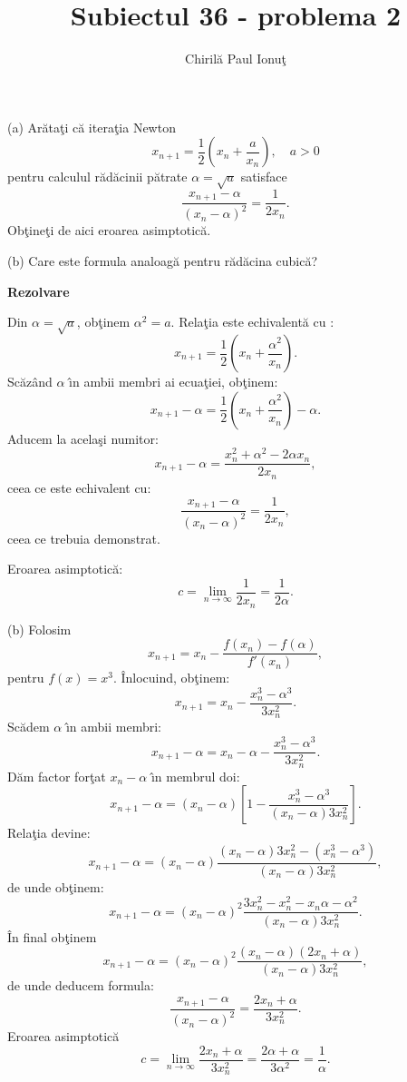 \documentclass[11pt]{article}
\theoremstyle{plain}
\theoremstyle{definition}
\theoremstyle{definition}
\theoremstyle{definition}
\theoremstyle{definition}
\theoremstyle{plain}
\begin{document}
\title{Subiectul 36 - problema 2}
\author{Chiril\u{a} Paul Ionu\c{t}}
\date{}
\maketitle
(a) Ar\u{a}ta\c{t}i c\u{a} itera\c{t}ia Newton
$$x_{n+1} = \frac{1}{2}\left(x_n + \frac{a}{x_n}\right), \quad a>0$$
pentru calculul r\u ad\u acinii p\u{a}trate $\alpha = \sqrt{a}$ satisface
$$\frac{x_{n+1}-\alpha}{(x_n -\alpha)^2} = \frac{1}{2x_n}.$$
Ob\c{t}ine\c{t}i de aici eroarea asimptotic\u{a}.

(b) Care este formula analoag\u{a} pentru r\u{a}d\u{a}cina cubic\u{a}?


\textbf{Rezolvare}

Din $\alpha = \sqrt{a}$, ob\c{t}inem $\alpha^2 =a$. Rela\c{t}ia este echivalent\u{a} cu :
$$x_{n+1} = \frac{1}{2}\left(x_n + \frac{\alpha^2}{x_n}\right).$$
Sc\u{a}z\^{a}nd $\alpha$ \^{\i}n ambii membri ai ecua\c{t}iei, ob\c{t}inem:
$$x_{n+1}-\alpha = \frac{1}{2}\left(x_n + \frac{\alpha^2}{x_n}\right)-\alpha.$$
Aducem la acela\c{s}i numitor:
$$x_{n+1}-\alpha = \frac{x_n^2+\alpha^2 -2\alpha x_n}{2x_n},$$
ceea ce este echivalent cu:
$$\frac{x_{n+1}-\alpha}{(x_n -\alpha)^2} = \frac{1}{2x_n},$$
ceea ce trebuia demonstrat.

Eroarea asimptotic\u{a}:
$$c = \lim_{n \to \infty} \frac{1}{2x_n} = \frac{1}{2\alpha}.$$

(b) Folosim 
$$x_{n+1} = x_{n} - \frac{f(x_n) - f(\alpha)}{f'(x_n)},$$
pentru $f(x) = x^3$.
\^{I}nlocuind, ob\c{t}inem:
$$x_{n+1} = x_n - \frac{x_n^3 - \alpha^3}{3x_n^2}.$$
Sc\u{a}dem $\alpha$ \^{\i}n ambii membri:
$$x_{n+1}- \alpha = x_n - \alpha - \frac{x_n^3 - \alpha^3}{3x_n^2}.$$
D\u{a}m factor for\c{t}at $x_n -\alpha$ \^{\i}n membrul doi:
$$x_{n+1}- \alpha = (x_n - \alpha)\left[1-\frac{x_n^3 - \alpha^3}{(x_n-\alpha)3x_n^2}\right].$$
Rela\c{t}ia devine:
$$x_{n+1}- \alpha = (x_n - \alpha)\frac{(x_n-\alpha)3x_n^2 - (x_n^3 - \alpha^3)}{(x_n-\alpha)3x_n^2},$$
de unde ob\c{t}inem:
$$x_{n+1}- \alpha = (x_n - \alpha)^2 \frac{3x_n^2 - x_n^2 - x_n \alpha - \alpha^2}{(x_n-\alpha)3x_n^2}.$$
\^{I}n final ob\c{t}inem
$$x_{n+1}- \alpha = (x_n - \alpha)^2 \frac{(x_n - \alpha)(2x_n+\alpha)}{(x_n - \alpha)3x_n^2},$$
de unde deducem formula:
$$\frac{x_{n+1}-\alpha}{(x_n - \alpha)^2} = \frac{2x_n+ \alpha}{3x_n^2}.$$
Eroarea asimptotic\u{a}
$$c = \lim_{n \to \infty} \frac{2x_n+ \alpha}{3x_n^2} = \frac{2\alpha +\alpha}{3\alpha^2} = \frac{1}{\alpha}.$$
\end{document}
